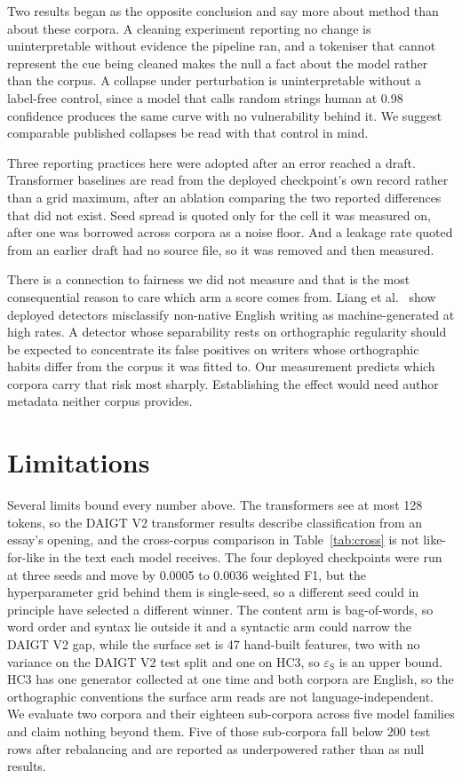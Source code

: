 Two results began as the opposite conclusion and say more about method than about these corpora. A cleaning experiment reporting no change is uninterpretable without evidence the pipeline ran, and a tokeniser that cannot represent the cue being cleaned makes the null a fact about the model rather than the corpus. A collapse under perturbation is uninterpretable without a label-free control, since a model that calls random strings human at 0.98 confidence produces the same curve with no vulnerability behind it. We suggest comparable published collapses be read with that control in mind.

Three reporting practices here were adopted after an error reached a draft. Transformer baselines are read from the deployed checkpoint's own record rather than a grid maximum, after an ablation comparing the two reported differences that did not exist. Seed spread is quoted only for the cell it was measured on, after one was borrowed across corpora as a noise floor. And a leakage rate quoted from an earlier draft had no source file, so it was removed and then measured.

There is a connection to fairness we did not measure and that is the most consequential reason to care which arm a score comes from. Liang et al.~\cite{Liang2023gpt} show deployed detectors misclassify non-native English writing as machine-generated at high rates. A detector whose separability rests on orthographic regularity should be expected to concentrate its false positives on writers whose orthographic habits differ from the corpus it was fitted to. Our measurement predicts which corpora carry that risk most sharply. Establishing the effect would need author metadata neither corpus provides.

\section{Limitations}
\label{sec:limitations}

Several limits bound every number above. The transformers see at most 128 tokens, so the DAIGT V2 transformer results describe classification from an essay's opening, and the cross-corpus comparison in Table~\ref{tab:cross} is not like-for-like in the text each model receives. The four deployed checkpoints were run at three seeds and move by 0.0005 to 0.0036 weighted F1, but the hyperparameter grid behind them is single-seed, so a different seed could in principle have selected a different winner. The content arm is bag-of-words, so word order and syntax lie outside it and a syntactic arm could narrow the DAIGT V2 gap, while the surface set is 47 hand-built features, two with no variance on the DAIGT V2 test split and one on HC3, so $\varepsilon_{\mathrm{S}}$ is an upper bound. HC3 has one generator collected at one time and both corpora are English, so the orthographic conventions the surface arm reads are not language-independent. We evaluate two corpora and their eighteen sub-corpora across five model families and claim nothing beyond them. Five of those sub-corpora fall below 200 test rows after rebalancing and are reported as underpowered rather than as null results.

